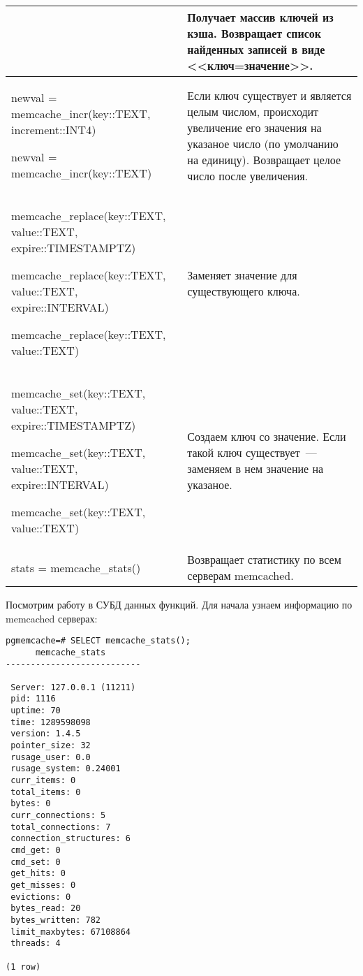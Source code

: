 \begin{table}[h]
\begin{tabular}{| >{\raggedright\scriptsize}p{7cm}| >{\scriptsize}p{7cm} |}
& 
Получает массив ключей из кэша.
Возвращает список найденных записей в виде <<ключ=значение>>.\\

\hline

newval = memcache\_incr(key::TEXT, increment::INT4)

newval = memcache\_incr(key::TEXT)

& 
Если ключ существует и является целым числом, происходит увеличение 
его значения на указаное число (по умолчанию на единицу). 
Возвращает целое число после увеличения.\\

\hline

memcache\_replace(key::TEXT, value::TEXT, expire::TIMESTAMPTZ)

memcache\_replace(key::TEXT, value::TEXT, expire::INTERVAL)

memcache\_replace(key::TEXT, value::TEXT)

& 
Заменяет значение для существующего ключа.\\

\hline

memcache\_set(key::TEXT, value::TEXT, expire::TIMESTAMPTZ)

memcache\_set(key::TEXT, value::TEXT, expire::INTERVAL)

memcache\_set(key::TEXT, value::TEXT)

& 
Создаем ключ со значение. Если такой ключ существует~--- заменяем в нем значение на указаное.\\

\hline

stats = memcache\_stats()

& 
Возвращает статистику по всем серверам memcached.\\

\hline
\end{tabular}
\end{table}

Посмотрим работу в СУБД данных функций. Для начала узнаем информацию по memcached серверах:
\begin{lstlisting}[label=lst:pgcache8,caption=Проверка memcache\_stats]
pgmemcache=# SELECT memcache_stats();
      memcache_stats       
---------------------------
 
 Server: 127.0.0.1 (11211)
 pid: 1116
 uptime: 70
 time: 1289598098
 version: 1.4.5
 pointer_size: 32
 rusage_user: 0.0
 rusage_system: 0.24001
 curr_items: 0
 total_items: 0
 bytes: 0
 curr_connections: 5
 total_connections: 7
 connection_structures: 6
 cmd_get: 0
 cmd_set: 0
 get_hits: 0
 get_misses: 0
 evictions: 0
 bytes_read: 20
 bytes_written: 782
 limit_maxbytes: 67108864
 threads: 4
 
(1 row)
\end{lstlisting}

